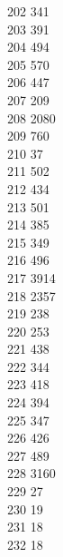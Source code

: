 { 202	341 \\
 203	391 \\
 204	494 \\
 205	570 \\
 206	447 \\
 207	209 \\
 208	2080 \\
 209	760 \\
 210	37 \\
 211	502 \\
 212	434 \\
 213	501 \\
 214	385 \\
 215	349 \\
 216	496 \\
 217	3914 \\
 218	2357 \\
 219	238 \\
 220	253 \\
 221	438 \\
 222	344 \\
 223	418 \\
 224	394 \\
 225	347 \\
 226	426 \\
 227	489 \\
 228	3160 \\
 229	27 \\
 230	19 \\
 231	18 \\
 232	18 \\
}
